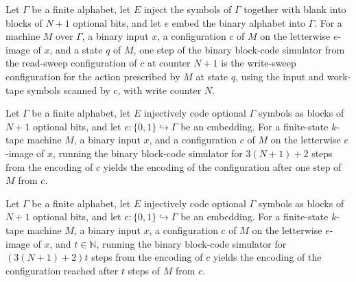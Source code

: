 \begin{lemma}
\label{Turing.FinTM.arReadCfg_dispatch}
\leanok
{}
Let $\Gamma$ be a finite alphabet, let $E$ inject the symbols of $\Gamma$ together with
blank into blocks of $N+1$ optional bits, and let $e$ embed the binary alphabet into
$\Gamma$. For a machine $M$ over $\Gamma$, a binary input $x$, a configuration $c$ of
$M$ on the letterwise $e$-image of $x$, and a state $q$ of $M$, one step of the binary
block-code simulator from the read-sweep configuration of $c$ at counter $N+1$ is the
write-sweep configuration for the action prescribed by $M$ at state $q$, using the input
and work-tape symbols scanned by $c$, with write counter $N$.
\end{lemma}

\begin{lemma}
\label{Turing.FinTM.arCfg_cycle}
\leanok
{}
Let $\Gamma$ be a finite alphabet, let $E$ injectively code optional $\Gamma$
symbols as blocks of $N+1$ optional bits, and let $e:\{0,1\}\hookrightarrow\Gamma$ be an
embedding. For a finite-state $k$-tape machine $M$, a binary input $x$, and a
configuration $c$ of $M$ on the letterwise $e$-image of $x$, running the binary
block-code simulator for $3(N+1)+2$ steps from the encoding of $c$ yields the encoding
of the configuration after one step of $M$ from $c$.
\end{lemma}

\begin{lemma}
\label{Turing.FinTM.arCfg_run}
\leanok
{}
Let $\Gamma$ be a finite alphabet, let $E$ injectively code optional $\Gamma$
symbols as blocks of $N+1$ optional bits, and let $e:\{0,1\}\hookrightarrow\Gamma$ be an
embedding. For a finite-state $k$-tape machine $M$, a binary input $x$, a configuration
$c$ of $M$ on the letterwise $e$-image of $x$, and $t\in\mathbb{N}$, running the binary
block-code simulator for $(3(N+1)+2)t$ steps from the encoding of $c$ yields the
encoding of the configuration reached after $t$ steps of $M$ from $c$.
\end{lemma}

